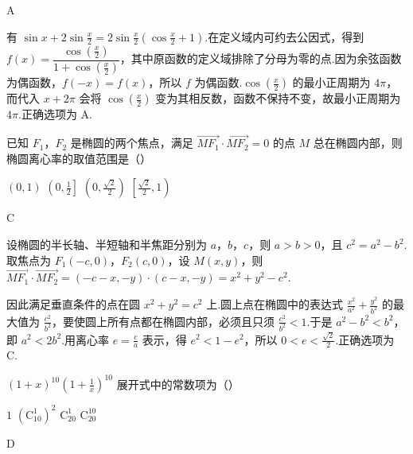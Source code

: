\begin{answer}
A
\end{answer}

\begin{solution}
有 \(\sin x+2\sin\frac x2=2\sin\frac x2\left(\cos\frac x2+1\right)\).在定义域内可约去公因式，得到 \(f(x)=\dfrac{\cos(\frac{x}{2})}{1+\cos(\frac{x}{2})}\)，其中原函数的定义域排除了分母为零的点.因为余弦函数为偶函数，\(f(-x)=f(x)\)，所以 \(f\) 为偶函数.\(\cos(\frac{x}{2})\) 的最小正周期为 \(4\pi\)，而代入 \(x+2\pi\) 会将 \(\cos(\frac{x}{2})\) 变为其相反数，函数不保持不变，故最小正周期为 \(4\pi\).正确选项为 A.
\end{solution}

\begin{problem}
已知 \(F_{1}\)，\(F_{2}\) 是椭圆的两个焦点，满足 \(\overrightarrow{MF_{1}} \cdot \overrightarrow{MF_{2}} = 0\) 的点 \(M\) 总在椭圆内部，则椭圆离心率的取值范围是（\quad）

\choices
    {\((0,1)\)}
    {\(\left(0, \frac{1}{2}\right]\)}
    {\(\left(0, \frac{\sqrt{2}}{2}\right)\)}
    {\(\left[\frac{\sqrt{2}}{2}, 1\right)\)}
\end{problem}

\begin{answer}
C
\end{answer}

\begin{solution}
设椭圆的半长轴、半短轴和半焦距分别为 \(a\)，\(b\)，\(c\)，则 \(a>b>0\)，且 \(c^2=a^2-b^2\).取焦点为 \(F_1(-c,0)\)，\(F_2(c,0)\)，设 \(M(x,y)\)，则 \(\overrightarrow{MF_1}\cdot\overrightarrow{MF_2}=(-c-x,-y)\cdot(c-x,-y)=x^2+y^2-c^2\).

因此满足垂直条件的点在圆 \(x^2+y^2=c^2\) 上.圆上点在椭圆中的表达式 \(\frac{x^2}{a^2}+\frac{y^2}{b^2}\) 的最大值为 \(\frac{c^2}{b^2}\)，要使圆上所有点都在椭圆内部，必须且只须 \(\frac{c^2}{b^2}<1\).于是 \(a^2-b^2<b^2\)，即 \(a^2<2b^2\).用离心率 \(e=\frac ca\) 表示，得 \(e^2<1-e^2\)，所以 \(0<e<\frac{\sqrt2}{2}\).正确选项为 C.
\end{solution}

\begin{problem}
\((1 + x)^{10}\left(1 + \frac{1}{x}\right)^{10}\) 展开式中的常数项为（\quad）

\choices
    {\(1\)}
    {\((\mathrm C_{10}^{1})^{2}\)}
    {\(\mathrm C_{20}^{1}\)}
    {\(\mathrm C_{20}^{10}\)}
\end{problem}

\begin{answer}
D
\end{answer}

